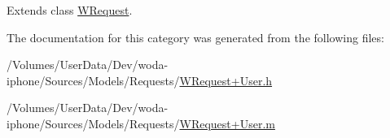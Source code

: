 Extends class \hyperlink{interface_w_request_ad4e64a826bae67b6d8ae922583a9f781}{W\-Request}.



The documentation for this category was generated from the following files\-:\begin{DoxyCompactItemize}
\item 
/\-Volumes/\-User\-Data/\-Dev/woda-\/iphone/\-Sources/\-Models/\-Requests/\hyperlink{_w_request_09_user_8h}{W\-Request+\-User.\-h}\item 
/\-Volumes/\-User\-Data/\-Dev/woda-\/iphone/\-Sources/\-Models/\-Requests/\hyperlink{_w_request_09_user_8m}{W\-Request+\-User.\-m}\end{DoxyCompactItemize}
